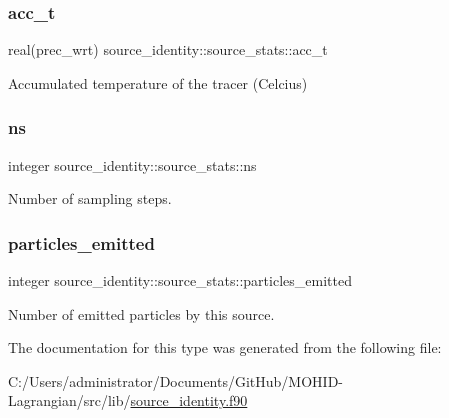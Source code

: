 \subsubsection{\texorpdfstring{acc\+\_\+t}{acc\_t}}
{\footnotesize\ttfamily real(prec\+\_\+wrt) source\+\_\+identity\+::source\+\_\+stats\+::acc\+\_\+t\hspace{0.3cm}{\ttfamily [private]}}



Accumulated temperature of the tracer (Celcius) 

\mbox{\label{structsource__identity_1_1source__stats_a0d1e978cf3224049d1c15b23b8d16fa7}} 
\subsubsection{\texorpdfstring{ns}{ns}}
{\footnotesize\ttfamily integer source\+\_\+identity\+::source\+\_\+stats\+::ns\hspace{0.3cm}{\ttfamily [private]}}



Number of sampling steps. 

\mbox{\label{structsource__identity_1_1source__stats_a1b11065093e55320520604392399d1c9}} 
\subsubsection{\texorpdfstring{particles\+\_\+emitted}{particles\_emitted}}
{\footnotesize\ttfamily integer source\+\_\+identity\+::source\+\_\+stats\+::particles\+\_\+emitted\hspace{0.3cm}{\ttfamily [private]}}



Number of emitted particles by this source. 



The documentation for this type was generated from the following file\+:\begin{DoxyCompactItemize}
\item 
C\+:/\+Users/administrator/\+Documents/\+Git\+Hub/\+M\+O\+H\+I\+D-\/\+Lagrangian/src/lib/\mbox{\hyperlink{source__identity_8f90}{source\+\_\+identity.\+f90}}\end{DoxyCompactItemize}
